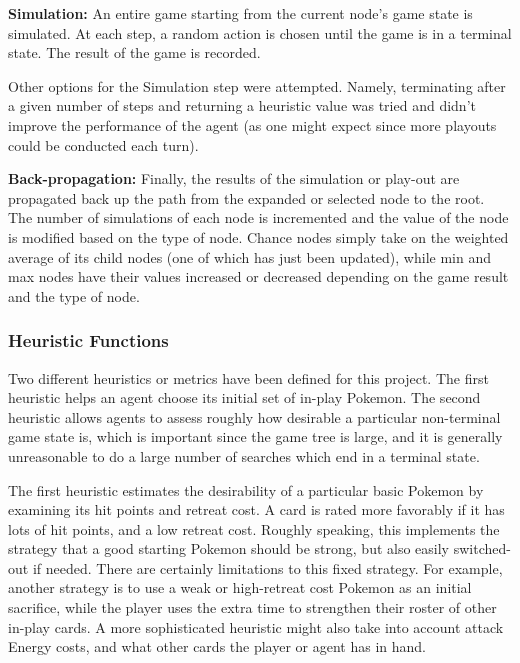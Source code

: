 \documentclass{article}
\begin{document}
\textbf{Simulation: } An entire game starting from the current node's game state is simulated. At each step, a random action is chosen until the game is in a terminal state. The result of the game is recorded.

Other options for the Simulation step were attempted. Namely, terminating after a given number of steps and returning a heuristic value was tried and didn't improve the performance of the agent (as one might expect since more playouts could be conducted each turn).

\textbf{Back-propagation: } Finally, the results of the simulation or play-out are propagated back up the path from the expanded or selected node to the root. The number of simulations of each node is incremented and the value of the node is modified based on the type of node. Chance nodes simply take on the weighted average of its child nodes (one of which has just been updated), while min and max nodes have their values increased or decreased depending on the game result and the type of node. 



\subsubsection{Heuristic Functions} %
Two different heuristics or metrics have been defined for this project.  The first heuristic helps an agent choose its initial set of in-play Pokemon.  The second heuristic allows agents to assess roughly how desirable a particular non-terminal game state is, which is important since the game tree is large, and it is generally unreasonable to do a large number of searches which end in a terminal state.

The first heuristic estimates the desirability of a particular basic Pokemon by examining its hit points and retreat cost.  A card is rated more favorably if it has lots of hit points, and a low retreat cost.  Roughly speaking, this implements the strategy that a good starting Pokemon should be strong, but also easily switched-out if needed.  There are certainly limitations to this fixed strategy.  For example, another strategy is to use a weak or high-retreat cost Pokemon as an initial sacrifice, while the player uses the extra time to strengthen their roster of other in-play cards.  A more sophisticated heuristic might also take into account attack Energy costs, and what other cards the player or agent has in hand.
\end{document}
